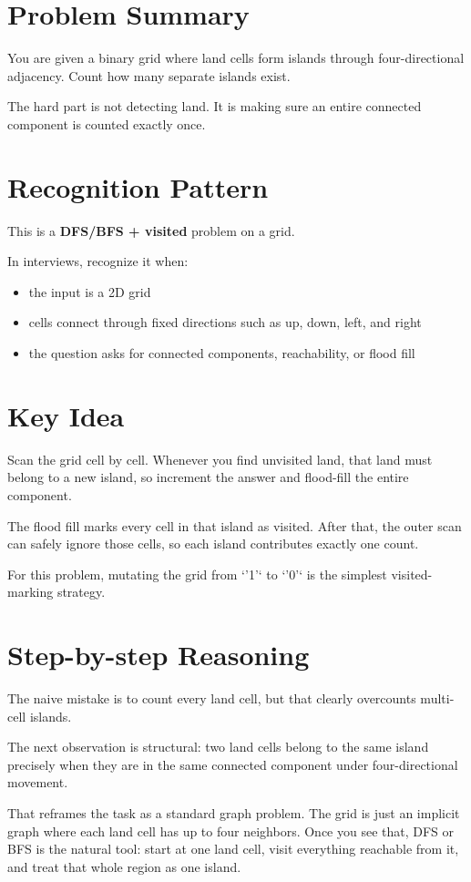\section{Problem Summary}
You are given a binary grid where land cells form islands through four-directional adjacency. Count how many separate islands exist.

The hard part is not detecting land. It is making sure an entire connected component is counted exactly once.

\section{Recognition Pattern}
This is a \textbf{DFS/BFS + visited} problem on a grid.

In interviews, recognize it when:
\begin{itemize}
\item the input is a 2D grid
\item cells connect through fixed directions such as up, down, left, and right
\item the question asks for connected components, reachability, or flood fill
\end{itemize}

\section{Key Idea}
Scan the grid cell by cell. Whenever you find unvisited land, that land must belong to a new island, so increment the answer and flood-fill the entire component.

The flood fill marks every cell in that island as visited. After that, the outer scan can safely ignore those cells, so each island contributes exactly one count.

For this problem, mutating the grid from `'1'` to `'0'` is the simplest visited-marking strategy.

\section{Step-by-step Reasoning}
The naive mistake is to count every land cell, but that clearly overcounts multi-cell islands.

The next observation is structural: two land cells belong to the same island precisely when they are in the same connected component under four-directional movement.

That reframes the task as a standard graph problem. The grid is just an implicit graph where each land cell has up to four neighbors. Once you see that, DFS or BFS is the natural tool: start at one land cell, visit everything reachable from it, and treat that whole region as one island.

